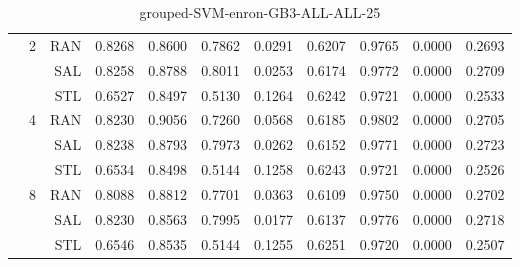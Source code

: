 \begin{center}
\begin{table}[htbp]
\begin{center}
\begin{tabular}{ | r | r | r | r | r | r | r | r | r | r | r |}
 & \multirow{3}{*}{2} & RAN & 0.8268 & 0.8600 & 0.7862 & 0.0291 & 0.6207 & 0.9765 & 0.0000 & 0.2693\\ \cline{3-11}
 &   & SAL & 0.8258 & 0.8788 & 0.8011 & 0.0253 & 0.6174 & 0.9772 & 0.0000 & 0.2709\\ \cline{3-11}
 &   & STL & 0.6527 & 0.8497 & 0.5130 & 0.1264 & 0.6242 & 0.9721 & 0.0000 & 0.2533\\ \cline{2-11}
 & \multirow{3}{*}{4} & RAN & 0.8230 & 0.9056 & 0.7260 & 0.0568 & 0.6185 & 0.9802 & 0.0000 & 0.2705\\ \cline{3-11}
 &   & SAL & 0.8238 & 0.8793 & 0.7973 & 0.0262 & 0.6152 & 0.9771 & 0.0000 & 0.2723\\ \cline{3-11}
 &   & STL & 0.6534 & 0.8498 & 0.5144 & 0.1258 & 0.6243 & 0.9721 & 0.0000 & 0.2526\\ \cline{2-11}
 & \multirow{3}{*}{8} & RAN & 0.8088 & 0.8812 & 0.7701 & 0.0363 & 0.6109 & 0.9750 & 0.0000 & 0.2702\\ \cline{3-11}
 &   & SAL & 0.8230 & 0.8563 & 0.7995 & 0.0177 & 0.6137 & 0.9776 & 0.0000 & 0.2718\\ \cline{3-11}
 &   & STL & 0.6546 & 0.8535 & 0.5144 & 0.1255 & 0.6251 & 0.9720 & 0.0000 & 0.2507\\ \cline{2-11}
\hline
\end{tabular}
\caption{grouped-SVM-enron-GB3-ALL-ALL-25}
\end{center}
 \end{table}
\end{center}

